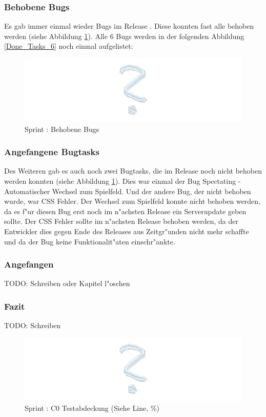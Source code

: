 \documentclass[12pt, titlepage]{scrartcl}
\newcommand{\RN}[1]{%
	\textup{\uppercase\expandafter{\romannumeral#1}}%
}
\begin{document}
    		\subsubsection{Behobene Bugs}
    			Es gab immer einmal wieder Bugs im Release \RN{3}. Diese konnten fast alle behoben werden (siehe Abbildung \ref{Fixed_Bugs_6}). Alle 6 Bugs werden in der folgenden Abbildung \ref{Done_Tasks_6} noch einmal aufgelistet:
    			\begin{figure}[H]
    				\centering
    				\includegraphics[width=\textwidth]{images/sprintVI/bugs.png}
    				\caption{Sprint \RN{6}: Behobene Bugs}
    				\label{Fixed_Bugs_6}
    			\end{figure}
    		\subsubsection{Angefangene Bugtasks}
    			Des Weiteren gab es auch noch zwei Bugtasks, die im Release \RN{3} noch nicht behoben werden konnten (siehe Abbildung \ref{Fixed_Bugs_6}). Dies war einmal der Bug \glqq Spectating - Automatischer Wechsel zum Spielfeld\grqq. Und der andere Bug, der nicht behoben wurde, war \glqq CSS Fehler\grqq. Der Wechsel zum Spielfeld konnte nicht behoben werden, da es f"ur diesen Bug erst noch im n"achsten Release ein Serverupdate geben sollte. Der CSS Fehler sollte im n"achsten Release behoben werden, da der Entwickler dies gegen Ende des Releases aus Zeitgr"unden nicht mehr schaffte und da der Bug keine Funktionalit"aten einschr"ankte.
	    	\subsubsection{Angefangen}
	    		TODO: Schreiben oder Kapitel l"oschen
	    	\subsubsection{Fazit}
	    		TODO: Schreiben
	    		\begin{figure}[H] 
	    			\centering
	    			\includegraphics[width=\textwidth]{images/sprintVI/coverage.png}
	    			\caption{Sprint \RN{6}: C0 Testabdeckung (Siehe Line, \%)}
	    			\label{Coverage_6}
	    		\end{figure} 
	\newpage
\end{document}
